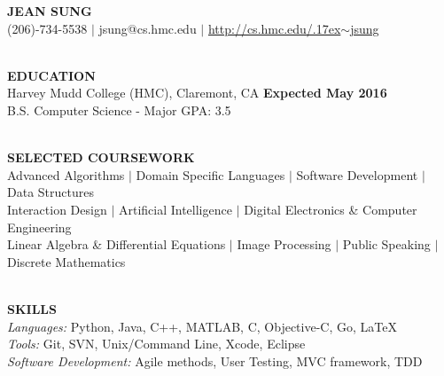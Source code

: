 \documentclass[11pt]{article}
\makeatletter
\newcommand{\selfName}{\textbf{\fontsize{30}{30}\selectfont JEAN SUNG }}
\newcommand{\email}{\large {jsung@cs.hmc.edu }}
\newcommand{\phone}{\large (206)-734-5538 }
\newcommand{\tildeText}{\raise.17ex\hbox{$\scriptstyle\sim$}}
\newcommand{\websitedisplaytext}{\large http://cs.hmc.edu/\tildeText jsung }
\newcommand{\website}{\href{http://cs.hmc.edu/~jsung}{\websitedisplaytext}}
\newcommand{\tag}{\textit{Passion for building software tools to better hanlde data analytics. }}
\newcommand{\wrapTitle}[1]{{\sectionNL \textbf{\Large #1}} \sectionNL}
\newcommand{\vb}{ $\mid$ }
\newcommand{\sectionNL}{~\\[1pt]}
\newcommand{\HMC}{HMC}
\newcommand{\rightAlign}{\hfill}
\makeatother
\begin{document}
\begin{center}
\selfName\\
\phone  
\vb\email 
\vb\website \\
\hrulefill
\end{center}


\begin{flushleft}
\wrapTitle{EDUCATION}
Harvey Mudd College (\HMC), Claremont, CA \rightAlign \textbf{Expected May 2016 } \\
B.S. Computer Science - Major GPA: 3.5   \\
\end{flushleft}


\begin{flushleft}
\wrapTitle{SELECTED COURSEWORK}
Advanced Algorithms
\vb Domain Specific Languages 
\vb Software Development 
\vb Data Structures  \\
Interaction Design 
\vb Artificial Intelligence 
\vb Digital Electronics \& Computer Engineering \\
Linear Algebra \& Differential Equations
\vb Image Processing  
\vb Public Speaking
\vb Discrete Mathematics


\end{flushleft}


\begin{flushleft}
\wrapTitle{SKILLS}
\textit{Languages:} Python, Java, C++, MATLAB, C, Objective-C, Go, \LaTeX \\
\textit{Tools:} Git, SVN, Unix/Command Line, Xcode, Eclipse \\ %
\textit{Software Development:} Agile methods, User Testing, MVC framework, TDD 

\end{flushleft}
\end{document}
